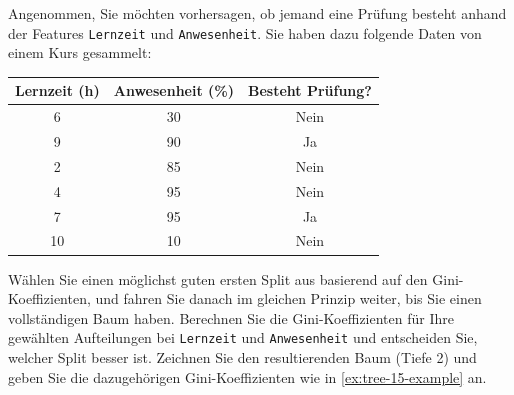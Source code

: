 \begin{myexercise}
    \label{ex:tree-15}
    Angenommen, Sie möchten vorhersagen, ob jemand eine Prüfung besteht anhand der Features \texttt{Lernzeit} und \texttt{Anwesenheit}. Sie haben dazu folgende Daten von einem Kurs gesammelt:
    \begin{center}
        \begin{tabular}{ccc}
            \toprule
            Lernzeit (h) & Anwesenheit (\%) & Besteht Prüfung? \\
            \midrule
            6            & 30               & Nein             \\
            9            & 90               & Ja               \\
            2            & 85               & Nein             \\
            4            & 95               & Nein             \\
            7            & 95               & Ja               \\
            10           & 10               & Nein             \\
            \bottomrule
        \end{tabular}
    \end{center}
    Wählen Sie einen möglichst guten ersten Split aus basierend auf den Gini-Koeffizienten, und fahren Sie danach im gleichen Prinzip weiter, bis Sie einen vollständigen Baum haben. Berechnen Sie die Gini-Koeffizienten für Ihre gewählten Aufteilungen bei \texttt{Lernzeit} und \texttt{Anwesenheit} und entscheiden Sie, welcher Split besser ist. Zeichnen Sie den resultierenden Baum (Tiefe 2) und geben Sie die dazugehörigen Gini-Koeffizienten wie in \cref{ex:tree-15-example} an.


\end{myexercise}
